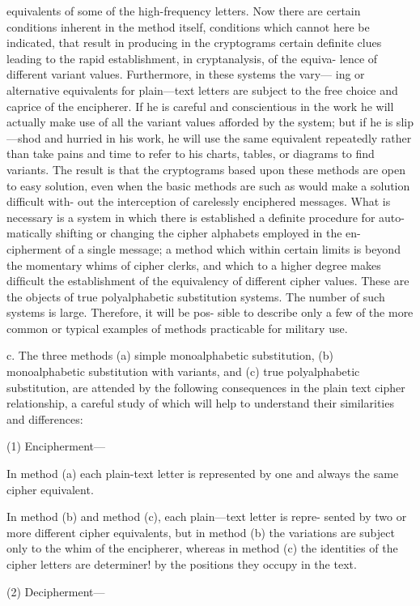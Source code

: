 {{{equivalents of some of the high-frequency letters. Now there are certain
conditions inherent in the method itself, conditions which cannot here be
indicated, that result in producing in the cryptograms certain deﬁnite
clues leading to the rapid establishment, in cryptanalysis, of the equiva-
lence of different variant values. Furthermore, in these systems the vary—
ing or alternative equivalents for plain—text letters are subject to the free
choice and caprice of the encipherer. If he is careful and conscientious
in the work he will actually make use of all the variant values afforded
by the system; but if he is slip—shod and hurried in his work, he will use
the same equivalent repeatedly rather than take pains and time to refer
to his charts, tables, or diagrams to ﬁnd variants. The result is that the
cryptograms based upon these methods are open to easy solution, even
when the basic methods are such as would make a solution difficult with-
out the interception of carelessly enciphered messages. What is necessary
is a system in which there is established a deﬁnite procedure for auto-
matically shifting or changing the cipher alphabets employed in the en-
cipherment of a single message; a method which within certain limits is
beyond the momentary whims of cipher clerks, and which to a higher
degree makes difﬁcult the establishment of the equivalency of different
cipher values. These are the objects of true polyalphabetic substitution
systems. The number of such systems is large. Therefore, it will be pos-
sible to describe only a few of the more common or typical examples of
methods practicable for military use.

c. The three methods (a) simple monoalphabetic substitution, (b)
monoalphabetic substitution with variants, and (c) true polyalphabetic
substitution, are attended by the following consequences in the plain text
cipher relationship, a careful study of which will help to understand their
similarities and differences:

(1) Encipherment—

In method (a) each plain-text letter is represented by one and
always the same cipher equivalent.

In method (b) and method (c), each plain—text letter is repre-
sented by two or more different cipher equivalents, but in
method (b) the variations are subject only to the whim of the
encipherer, whereas in method (c) the identities of the cipher
letters are determiner! by the positions they occupy in the
text.

(2) Decipherment—

}}}
